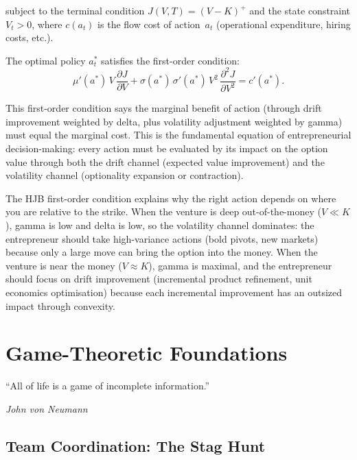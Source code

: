 \documentclass[12pt,a4paper,oneside]{book}
\theoremstyle{definition}
\theoremstyle{remark}
\begin{document}
subject to the terminal condition $J(V,T) = (V - K)^+$ and the state
constraint $V_t > 0$, where $c(a_t)$ is the flow cost of action~$a_t$
(operational expenditure, hiring costs, etc.).

The optimal policy $a^*_t$ satisfies the first-order condition:
\begin{equation}\label{eq:hjb_foc}
  \mu'(a^*)\,V\,\frac{\partial J}{\partial V}
  + \sigma(a^*)\,\sigma'(a^*)\,V^2\,\frac{\partial^2 J}{\partial V^2}
  = c'(a^*).
\end{equation}

This first-order condition says the marginal benefit of action (through drift
improvement weighted by delta, plus volatility adjustment weighted by gamma) must
equal the marginal cost. This is the fundamental equation of entrepreneurial
decision-making: every action must be evaluated by its impact on the option value
through both the drift channel (expected value improvement) and the volatility
channel (optionality expansion or contraction).

\begin{practicalimplication}
The HJB first-order condition explains why the right action depends on where you are
relative to the strike. When the venture is deep out-of-the-money ($V \ll K$), gamma
is low and delta is low, so the volatility channel dominates: the entrepreneur should
take high-variance actions (bold pivots, new markets) because only a large move can
bring the option into the money. When the venture is near the money ($V \approx K$),
gamma is maximal, and the entrepreneur should focus on drift improvement (incremental
product refinement, unit economics optimisation) because each incremental improvement
has an outsized impact through convexity.
\end{practicalimplication}

\chapter{Game-Theoretic Foundations}\label{ch:game}

\epigraph{``All of life is a game of incomplete information.''}
{\textit{John von Neumann}}

\section{Team Coordination: The Stag Hunt}
\end{document}
